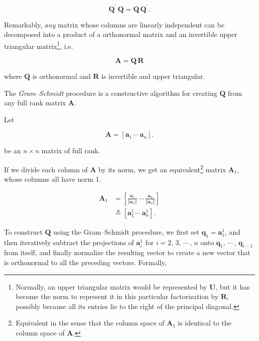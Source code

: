\documentclass[graybox,envcountchap,sectrefs]{svmono}\usepackage[]{graphicx}\usepackage[]{xcolor}
\begin{document}
\begin{appendices}
\begin{equation}
\mathrm{\mathbf{Q}}^{\prime}\,\mathrm{\mathbf{Q}}=\mathrm{\mathbf{Q}}\,\mathrm{\mathbf{Q}}^{\prime}.\label{eq:QtransposeQ_2}
\end{equation}

Remarkably, \emph{any} matrix whose columns are linearly independent
can be decomposed into a product of a orthonormal matrix and an invertible
upper triangular matrix\footnote{Normally, an upper triangular matrix would be represented by $\mathrm{\mathbf{U}}$,
but it has become the norm to represent it in this particular factorization
by $\mathrm{\mathbf{R}}$, possibly because all its entries lie to
the right of the principal diagonal.}, i.e.

\begin{equation}
\mathrm{\mathbf{A}}=\mathrm{\mathbf{Q}}\,\mathrm{\mathbf{R}}\label{eq:QRdecomposition}
\end{equation}

where $\mathrm{\mathbf{Q}}$ is orthonormal and $\mathrm{\mathbf{R}}$
is invertible and upper triangular.

The \emph{Gram--Schmidt} procedure is a constructive algorithm for
creating $\mathrm{\mathbf{Q}}$ from any full rank matrix $\mathrm{\mathbf{A}}$. 

Let

\begin{equation}
\mathrm{\mathbf{A}}=\left[\mathrm{\mathbf{a}}_{1}\,\cdots\,\mathrm{\mathbf{a}}_{n}\right].\label{eq:Amatrix}
\end{equation}

be an $n\times n$ matrix of full rank.

If we divide each column of $\mathrm{\mathbf{A}}$ by its norm, we
get an equivalent\footnote{Equivalent in the sense that the column space of $\mathrm{\mathbf{A}}_{1}$
is identical to the column space of $\mathrm{\mathbf{A}}$.} matrix $\mathrm{\mathbf{A}}_{1}$, whose columns all have norm 1. 

\begin{align}
\mathrm{\mathbf{A}}_{1} & =\left[\frac{\mathrm{\mathbf{a}}_{1}}{\left\Vert \mathrm{\mathbf{a}}_{1}\right\Vert }\,\cdots\,\frac{\mathrm{\mathbf{a}}_{n}}{\left\Vert \mathrm{\mathbf{a}}_{n}\right\Vert }\right]\nonumber \\
 & \triangleq\left[\mathrm{\mathbf{a}}_{1}^{1}\,\cdots\,\mathrm{\mathbf{a}}_{n}^{1}\right].\label{eq:A1matrix}
\end{align}

To construct $\mathbf{Q}$ using the Gram--Schmidt procedure, we
first set $\mathrm{\mathbf{q}}_{1}=\mathrm{\mathbf{a}}_{1}^{1}$,
and then iteratively subtract the projections of $\mathrm{\mathbf{a}}_{i}^{1}$
for $i=2,\,3,\,\cdots\,,\,n$ onto $\mathrm{\mathbf{q}}_{1},\,\cdots\,,\,\mathrm{\mathbf{q}}_{i-1}$
from itself, and finally normalize the resulting vector to create
a new vector that is orthonormal to all the preceding vectors. Formally,


\end{appendices}
\end{document}
